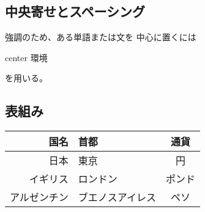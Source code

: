 \documentclass[12pt,a4j]{jarticle}
\begin{document}
\subsection{中央寄せとスペーシング}
強調のため、ある単語または文を
中心に置くには
\begin{center}
center 環境
\end{center}
を用いる。

\subsection{表組み}
\begin{center}
\begin{tabular}{r|lc}
\hline
国名 & 首都 & 通貨 \\
\hline
日本 & 東京 & 円 \\
イギリス & ロンドン & ポンド \\
アルゼンチン&ブエノスアイレス&ペソ\\
\hline
\end{tabular}
\end{center}
\end{document}

